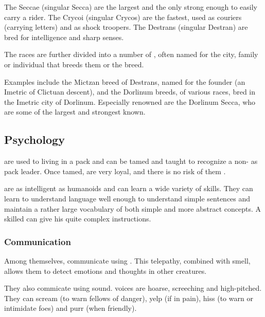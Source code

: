 The Seccae (singular Secca) are the largest and the only \nycans{} strong enough to easily carry a rider. 
The Crycoi (singular Crycos) are the fastest, used as couriers (carrying letters) and as shock troopers. 
The Destrans (singular Destran) are bred for intelligence and sharp senses. 

The races are further divided into a number of , often named for the city, family or individual that breeds them or  the breed. 

Examples include the Mictzan breed of Destrans, named for the founder (an Imetric \scatha{} of Clictuan descent), and the Dorlinum breeds, of various races, bred in the Imetric city of Dorlinum. Especially renowned are the Dorlinum Secca, who are some of the largest and strongest \nycans{} known. 









\subsection{Psychology}
\Nycans{} are used to living in a pack and can be tamed and taught to recognize a non-\nycan{} as pack leader. Once tamed, \nycans{} are very loyal, and there is no risk of them . 

\Nycans{} are as intelligent as humanoids and can learn a wide variety of skills. They can learn to understand language well enough to understand simple sentences and maintain a rather large vocabulary of both simple and more abstract concepts. A skilled  can give his \nycans{} quite complex instructions. 





\subsubsection{Communication}
Among themselves, \nycans{} communicate using . 
This telepathy, combined with smell, allows them to detect emotions and thoughts in other creatures. 

They also commicate using sound. \Nycan{} voices are hoarse, screeching and high-pitched. They can scream (to warn fellows of danger), yelp (if in pain), hiss (to warn or intimidate foes) and purr (when friendly). 


